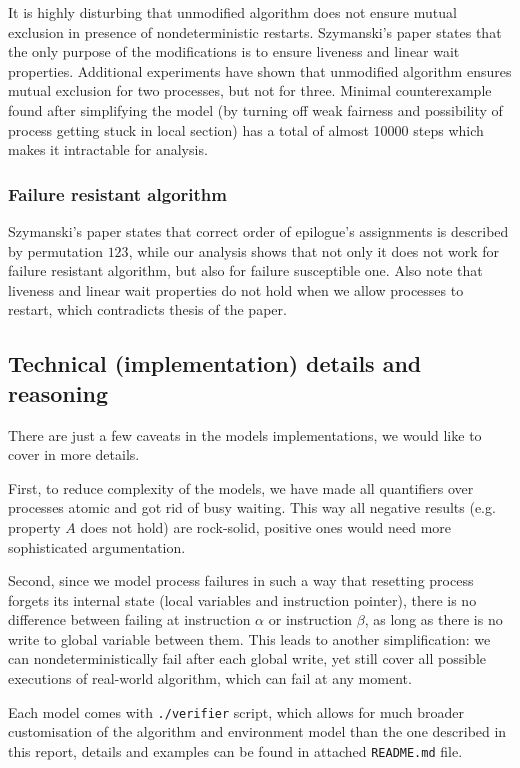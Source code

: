 It is highly disturbing that unmodified algorithm does not ensure mutual exclusion in presence of nondeterministic restarts.
Szymanski's paper \cite{Original} states that the only purpose of the modifications is to ensure liveness and linear wait properties.
Additional experiments have shown that unmodified algorithm ensures mutual exclusion for two processes, but not for three.
Minimal counterexample found after simplifying the model (by turning off weak fairness and possibility of process getting stuck in local section) has a total of almost 10000 steps which makes it intractable for analysis.

\subsubsection*{Failure resistant algorithm}

Szymanski's paper \cite{Original} states that correct order of epilogue's assignments is described by permutation $123$, while our analysis shows that not only it does not work for failure resistant algorithm, but also for failure susceptible one.
Also note that liveness and linear wait properties do not hold when we allow processes to restart, which contradicts thesis of the paper.

\subsection*{Technical (implementation) details and reasoning}

There are just a few caveats in the models implementations, we would like to cover in more details.

First, to reduce complexity of the models, we have made all quantifiers over processes atomic and got rid of busy waiting.
This way all negative results (e.g. property $A$ does not hold) are rock-solid, positive ones would need more sophisticated argumentation.

Second, since we model process failures in such a way that resetting process forgets its internal state (local variables and instruction pointer), there is no difference between failing at instruction $\alpha$ or instruction $\beta$, as long as there is no write to global variable between them.
This leads to another simplification: we can nondeterministically fail after each global write, yet still cover all possible executions of real-world algorithm, which can fail at any moment.

Each model comes with \verb+./verifier+ script, which allows for much broader customisation of the algorithm and environment model than the one described in this report, details and examples can be found in attached \verb+README.md+ file.

